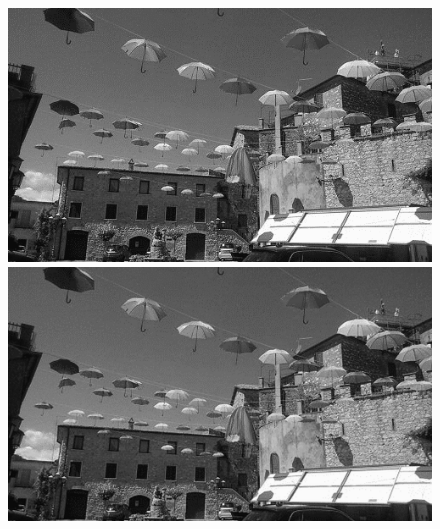 \documentclass{article}
\begin{document}
	\begin{figure}[!ht]	
	\centering	
	\includegraphics[scale=0.7]{img/gray-obraz1}	
	\includegraphics[scale=0.7]{img/geometryczne/skalowanie_jednorodne-gray}
	

\end{figure}
\end{document}
